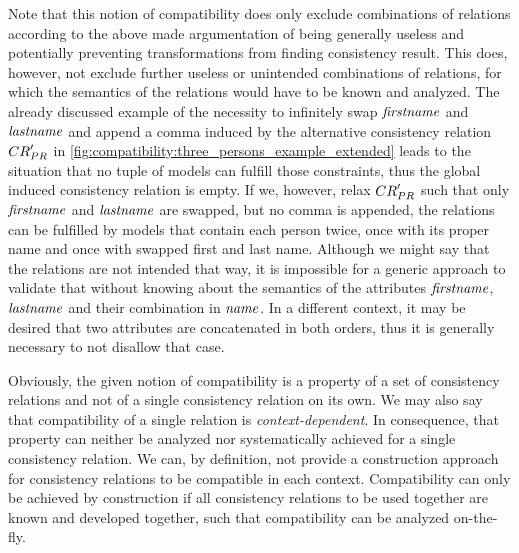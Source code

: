 Note that this notion of compatibility does only exclude combinations of relations according to the above made argumentation of being generally useless and potentially preventing transformations from finding consistency result.
This does, however, not exclude further useless or unintended combinations of relations, for which the semantics of the relations would have to be known and analyzed.
The already discussed example of the necessity to infinitely swap $\mathit{firstname}$ and $\mathit{lastname}$ and append a comma induced by the alternative consistency relation $\consistencyrelation{CR}{PR}'$ in \autoref{fig:compatibility:three_persons_example_extended} leads to the situation that no tuple of models can fulfill those constraints, thus the global induced consistency relation is empty.
If we, however, relax $\consistencyrelation{CR}{PR}'$ such that only $\mathit{firstname}$ and $\mathit{lastname}$ are swapped, but no comma is appended, the relations can be fulfilled by models that contain each person twice, once with its proper name and once with swapped first and last name.
Although we might say that the relations are not intended that way, it is impossible for a generic approach to validate that without knowing about the semantics of the attributes $\mathit{firstname}$, $\mathit{lastname}$ and their combination in $\mathit{name}$.
In a different context, it may be desired that two attributes are concatenated in both orders, thus it is generally necessary to not disallow that case.

Obviously, the given notion of compatibility is a property of a set of consistency relations and not of a single consistency relation on its own.
We may also say that compatibility of a single relation is \emph{context-dependent}.
In consequence, that property can neither be analyzed nor systematically achieved for a single consistency relation.
We can, by definition, not provide a construction approach for consistency relations to be compatible in each context.
Compatibility can only be achieved by construction if all consistency relations to be used together are known and developed together, such that compatibility can be analyzed on-the-fly.

